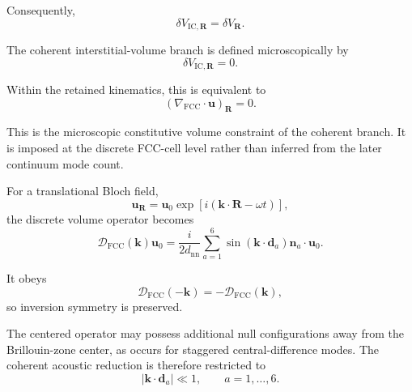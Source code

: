 Consequently,
\begin{equation}
    \delta V_{\mathrm{IC},\mathbf{R}}
    =
    \delta V_{\mathbf{R}}.
\end{equation}

The coherent interstitial-volume branch is defined microscopically by
\begin{equation}
    \boxed{
    \delta V_{\mathrm{IC},\mathbf{R}}
    =
    0.
    }
\end{equation}

Within the retained kinematics, this is equivalent to
\begin{equation}
    \boxed{
    \left(
        \nabla_{\mathrm{FCC}}
        \cdot
        \mathbf{u}
    \right)_{\mathbf{R}}
    =
    0.
    }
\end{equation}

This is the microscopic constitutive volume constraint of the coherent branch. It is imposed at the discrete FCC-cell level rather than inferred from the later continuum mode count.

For a translational Bloch field,
\begin{equation}
    \mathbf{u}_{\mathbf{R}}
    =
    \mathbf{u}_0
    \exp
    \left[
        i
        \left(
            \mathbf{k}\cdot\mathbf{R}
            -
            \omega t
        \right)
    \right],
\end{equation}
the discrete volume operator becomes
\begin{equation}
    \mathcal{D}_{\mathrm{FCC}}(\mathbf{k})
    \mathbf{u}_0
    =
    \frac{i}{2d_{\mathrm{nn}}}
    \sum_{a=1}^{6}
    \sin
    \left(
        \mathbf{k}\cdot\mathbf{d}_a
    \right)
    \hat{\mathbf{n}}_a
    \cdot
    \mathbf{u}_0.
\end{equation}

It obeys
\begin{equation}
    \mathcal{D}_{\mathrm{FCC}}(-\mathbf{k})
    =
    -
    \mathcal{D}_{\mathrm{FCC}}(\mathbf{k}),
\end{equation}
so inversion symmetry is preserved.

The centered operator may possess additional null configurations away from the Brillouin-zone center, as occurs for staggered central-difference modes. The coherent acoustic reduction is therefore restricted to
\begin{equation}
    \left|
        \mathbf{k}\cdot\mathbf{d}_a
    \right|
    \ll
    1,
    \qquad
    a=1,\ldots,6.
\end{equation}

